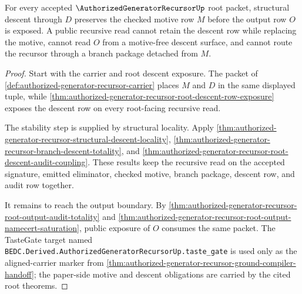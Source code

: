 \begin{theorem}
\label{thm:authorized-generator-recursor-root-motive-descent-stability}
For every accepted $\AuthorizedGeneratorRecursorUp$ root packet, structural descent through $D$ preserves the checked motive row $M$ before the output row $O$ is exposed. A public recursive read cannot retain the descent row while replacing the motive, cannot read $O$ from a motive-free descent surface, and cannot route the recursor through a branch package detached from $M$.
\end{theorem}
\begin{proof}
Start with the carrier and root descent exposure. The packet of \autoref{def:authorized-generator-recursor-carrier} places $M$ and $D$ in the same displayed tuple, while \autoref{thm:authorized-generator-recursor-root-descent-row-exposure} exposes the descent row on every root-facing recursive read.

The stability step is supplied by structural locality. Apply \autoref{thm:authorized-generator-recursor-structural-descent-locality}, \autoref{thm:authorized-generator-recursor-branch-descent-totality}, and \autoref{thm:authorized-generator-recursor-root-descent-audit-coupling}. These results keep the recursive read on the accepted signature, emitted eliminator, checked motive, branch package, descent row, and audit row together.

It remains to reach the output boundary. By \autoref{thm:authorized-generator-recursor-root-output-audit-totality} and \autoref{thm:authorized-generator-recursor-root-output-namecert-saturation}, public exposure of $O$ consumes the same packet. The TasteGate target named \texttt{BEDC.Derived.AuthorizedGeneratorRecursorUp.taste\_gate} is used only as the aligned-carrier marker from \autoref{thm:authorized-generator-recursor-ground-compiler-handoff}; the paper-side motive and descent obligations are carried by the cited root theorems.
\end{proof}

